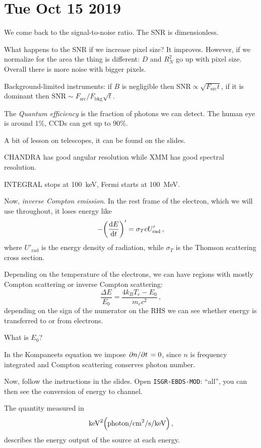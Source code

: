 \documentclass[main.tex]{subfiles}
\begin{document}
\section*{Tue Oct 15 2019}

We come back to the signal-to-noise ratio. 
The SNR is dimensionless.

What happens to the SNR if we increase pixel size?
It improves. However, if we normalize for the area the thing is different: \(D\) and \(R_N^2\) go up with pixel size. Overall there is more noise with bigger pixels.

Background-limited instruments: if \(B\) is negligible then \(\text{SNR} \propto \sqrt{F _{\text{src}} t} \), if it is dominant then \(\text{SNR} \sim F _{\text{src}}/ F _{\text{bkg}} \sqrt{t} \).

The \emph{Quantum efficiency} is the fraction of photons we can detect. The human eye is around 1\%, CCDs can get up to 90\%.

A bit of lesson on telescopes, it can be found on the slides.

CHANDRA has good angular resolution while XMM has good spectral resolution.

INTEGRAL stops at \SI{100}{keV}, Fermi starts at \SI{100}{MeV}.

Now, \emph{inverse Compton emission}.
In the rest frame of the electron, which we will use throughout, it loses energy like 
%
\begin{equation}
  - \qty(\dv{E}{t} )' = \sigma _T c U' _{\text{rad}}
\,,
\end{equation}
%
where \(U' _{\text{rad}}\) is the energy density of radiation,  while \(\sigma _T\) is the Thomson scattering cross section.

Depending on the temperature of the electrons, we can have regions with mostly Compton scattering or inverse Compton scattering: 
%
\begin{equation}
  \frac{\Delta E}{E_0} = \frac{4 k_B T_e - E_0 }{m_e c^2}
\,,
\end{equation}
%
depending on the sign of the numerator on the RHS we can see whether energy is transferred to or from electrons.

\begin{greenbox}
  What is \(E_0 \)?
\end{greenbox}

In the Kompaneets equation we impose \(\pdv*{n}{t} = 0\), since \(n\) is frequency integrated and Compton scattering conserves photon number.

Now, follow the instructions in the slides. Open \texttt{ISGR-EBDS-MOD}: ``all'', you can then see the conversion of energy to channel.

The quantity measured in 
%
\begin{equation}
  \SI{}{keV}^2 \qty(\SI{}{photon / cm^2 / s / keV})
\,,
\end{equation}
%
describes the energy output of the source at each energy.
\end{document}
